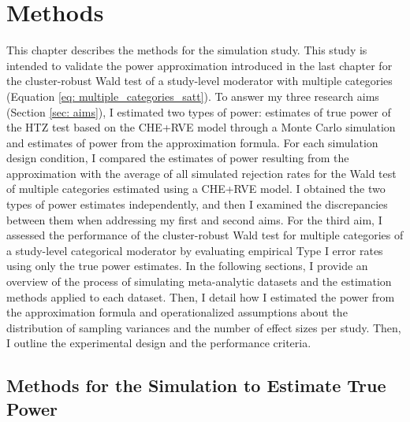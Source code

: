\chapter{Methods}\label{ch: methods}

This chapter describes the methods for the simulation study. This study is intended to validate the power approximation introduced in the last chapter for the cluster-robust Wald test of a study-level moderator with multiple categories (Equation \ref{eq: multiple_categories_satt}). To answer my three research aims (Section \ref{sec: aims}), I estimated two types of power: estimates of true power of the HTZ test based on the CHE+RVE model through a Monte Carlo simulation and estimates of power from the approximation formula. For each simulation design condition, I compared the estimates of power resulting from the approximation with the average of all simulated rejection rates for the Wald test of multiple categories estimated using a CHE+RVE model. I obtained the two types of power estimates independently, and then I examined the discrepancies between them when addressing my first and second aims. For the third aim, I assessed the performance of the cluster-robust Wald test for multiple categories of a study-level categorical moderator by evaluating empirical Type I error rates using only the true power estimates. 
In the following sections, I provide an overview of the process of simulating meta-analytic datasets and the estimation methods applied to each dataset. Then, I detail how I estimated the power from the approximation formula and operationalized assumptions about the distribution of sampling variances and the number of effect sizes per study. Then, I outline the experimental design and the performance criteria.    


\section{Methods for the Simulation to Estimate True Power}


